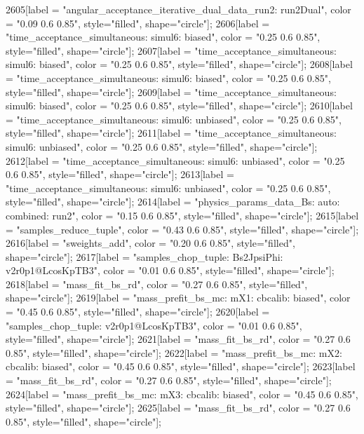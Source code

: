 {	2605[label = "angular_acceptance_iterative_dual_data_run2\nangacc: run2Dual", color = "0.09 0.6 0.85", style="filled", shape="circle"];
	2606[label = "time_acceptance_simultaneous\ntimeacc: simul6\ntrigger: biased", color = "0.25 0.6 0.85", style="filled", shape="circle"];
	2607[label = "time_acceptance_simultaneous\ntimeacc: simul6\ntrigger: biased", color = "0.25 0.6 0.85", style="filled", shape="circle"];
	2608[label = "time_acceptance_simultaneous\ntimeacc: simul6\ntrigger: biased", color = "0.25 0.6 0.85", style="filled", shape="circle"];
	2609[label = "time_acceptance_simultaneous\ntimeacc: simul6\ntrigger: biased", color = "0.25 0.6 0.85", style="filled", shape="circle"];
	2610[label = "time_acceptance_simultaneous\ntimeacc: simul6\ntrigger: unbiased", color = "0.25 0.6 0.85", style="filled", shape="circle"];
	2611[label = "time_acceptance_simultaneous\ntimeacc: simul6\ntrigger: unbiased", color = "0.25 0.6 0.85", style="filled", shape="circle"];
	2612[label = "time_acceptance_simultaneous\ntimeacc: simul6\ntrigger: unbiased", color = "0.25 0.6 0.85", style="filled", shape="circle"];
	2613[label = "time_acceptance_simultaneous\ntimeacc: simul6\ntrigger: unbiased", color = "0.25 0.6 0.85", style="filled", shape="circle"];
	2614[label = "physics_params_data_Bs\nfit: auto\ntrigger: combined\nyear: run2", color = "0.15 0.6 0.85", style="filled", shape="circle"];
	2615[label = "samples_reduce_tuple", color = "0.43 0.6 0.85", style="filled", shape="circle"];
	2616[label = "sweights_add", color = "0.20 0.6 0.85", style="filled", shape="circle"];
	2617[label = "samples_chop_tuple\nmode: Bs2JpsiPhi\nversion: v2r0p1@LcosKpTB3", color = "0.01 0.6 0.85", style="filled", shape="circle"];
	2618[label = "mass_fit_bs_rd", color = "0.27 0.6 0.85", style="filled", shape="circle"];
	2619[label = "mass_prefit_bs_mc\nmassbin: mX1\nmassmodel: cbcalib\ntrigger: biased", color = "0.45 0.6 0.85", style="filled", shape="circle"];
	2620[label = "samples_chop_tuple\nversion: v2r0p1@LcosKpTB3", color = "0.01 0.6 0.85", style="filled", shape="circle"];
	2621[label = "mass_fit_bs_rd", color = "0.27 0.6 0.85", style="filled", shape="circle"];
	2622[label = "mass_prefit_bs_mc\nmassbin: mX2\nmassmodel: cbcalib\ntrigger: biased", color = "0.45 0.6 0.85", style="filled", shape="circle"];
	2623[label = "mass_fit_bs_rd", color = "0.27 0.6 0.85", style="filled", shape="circle"];
	2624[label = "mass_prefit_bs_mc\nmassbin: mX3\nmassmodel: cbcalib\ntrigger: biased", color = "0.45 0.6 0.85", style="filled", shape="circle"];
	2625[label = "mass_fit_bs_rd", color = "0.27 0.6 0.85", style="filled", shape="circle"];
}
